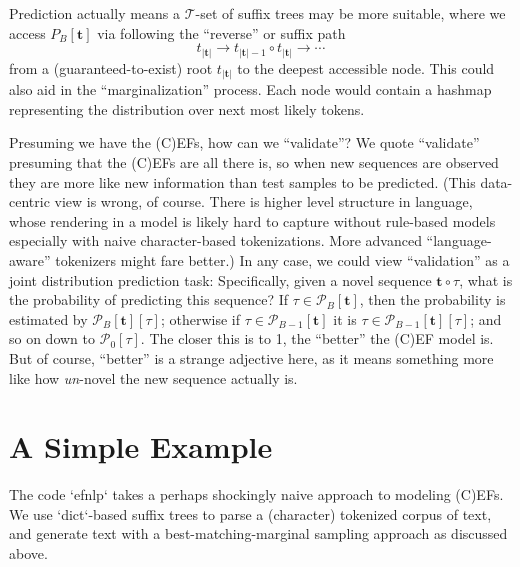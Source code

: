 \documentclass[11pt, oneside]{amsart}   	%
\begin{document}
Prediction actually means a $\mathcal{T}$-set of suffix trees may be more suitable, where we access $P_B[\mathbf{t}]$ via following the ``reverse'' or suffix path 
\begin{equation*}
	t_{|\mathbf{t}|} \rightarrow t_{|\mathbf{t}|-1} \circ t_{|\mathbf{t}|} \rightarrow \dotsb
\end{equation*}
from a (guaranteed-to-exist) root $t_{|\mathbf{t}|}$ to the deepest accessible node. This could also aid in the ``marginalization'' process. Each node would contain  a hashmap representing the distribution over next most likely tokens. 

Presuming we have the (C)EFs, how can we ``validate''? We quote ``validate'' presuming that the (C)EFs are all there is, so when new sequences are observed they are more like new information than test samples to be predicted. (This data-centric view is wrong, of course. There is higher level structure in language, whose rendering in a model is likely hard to capture without rule-based models especially with naive character-based tokenizations. More advanced ``language-aware'' tokenizers might fare better.) In any case, we could view ``validation'' as a joint distribution prediction task: Specifically, given a novel sequence $\mathbf{t} \circ \tau$, what is the probability of predicting this sequence? If $\tau \in \mathcal{P}_B[\mathbf{t}]$, then the probability is estimated by $\mathcal{P}_B[\mathbf{t}][\tau]$; otherwise if $\tau \in \mathcal{P}_{B-1}[\mathbf{t}]$ it is $\tau \in \mathcal{P}_{B-1}[\mathbf{t}][\tau]$; and so on down to $\mathcal{P}_0[\tau]$. The closer this is to 1, the ``better'' the (C)EF model is. But of course, ``better'' is a strange adjective here, as it means something more like how {\em un}-novel the new sequence actually is. 

\section{A Simple Example}

The code `efnlp` takes a perhaps shockingly naive approach to modeling (C)EFs. We use `dict`-based suffix trees to parse a (character) tokenized corpus of text, and generate text with a best-matching-marginal sampling approach as discussed above. 
\end{document}
